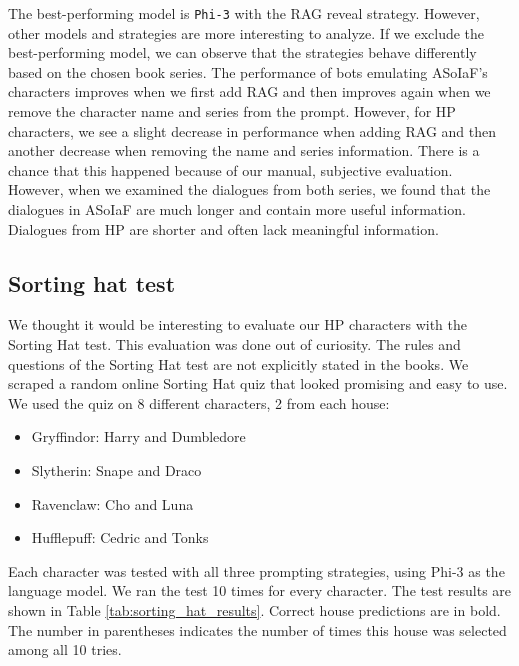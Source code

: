 \documentclass[fleqn,moreauthors,10pt]{ds_report}
\begin{document}
The best-performing model is \texttt{Phi-3} with the RAG reveal strategy.
However, other models and strategies are more interesting to analyze.
If we exclude the best-performing model, we can observe that the strategies behave differently based on the chosen book series.
The performance of bots emulating ASoIaF's characters improves when we first add RAG and then improves again when we remove the character name and series from the prompt.
However, for HP characters, we see a slight decrease in performance when adding RAG and then another decrease when removing the name and series information.
There is a chance that this happened because of our manual, subjective evaluation.
However, when we examined the dialogues from both series, we found that the dialogues in ASoIaF are much longer and contain more useful information.
Dialogues from HP are shorter and often lack meaningful information.

\subsection*{Sorting hat test}

We thought it would be interesting to evaluate our HP characters with the Sorting Hat test.
This evaluation was done out of curiosity.
The rules and questions of the Sorting Hat test are not explicitly stated in the books.
We scraped a random online Sorting Hat quiz that looked promising and easy to use.
We used the quiz on 8 different characters, 2 from each house:
\begin{itemize}
	\item Gryffindor: Harry and Dumbledore
	\item Slytherin: Snape and Draco
	\item Ravenclaw: Cho and Luna
	\item Hufflepuff: Cedric and Tonks
\end{itemize}
Each character was tested with all three prompting strategies, using Phi-3 as the language model.
We ran the test 10 times for every character.
The test results are shown in Table \ref{tab:sorting_hat_results}.
Correct house predictions are in bold.
The number in parentheses indicates the number of times this house was selected among all 10 tries.
\end{document}
